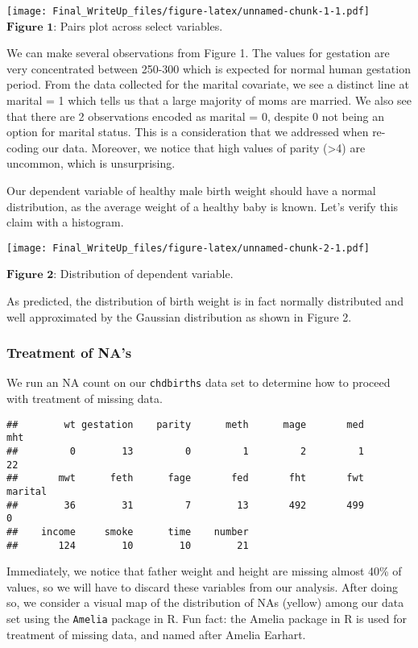 \documentclass[]{article}
\begin{document}
\texttt{[image: Final\_WriteUp\_files/figure-latex/unnamed-chunk-1-1.pdf]}
\(\textbf{Figure 1}\): Pairs plot across select variables.

We can make several observations from Figure 1. The values for gestation
are very concentrated between 250-300 which is expected for normal human
gestation period. From the data collected for the marital covariate, we
see a distinct line at marital = 1 which tells us that a large majority
of moms are married. We also see that there are 2 observations encoded
as marital = 0, despite 0 not being an option for marital status. This
is a consideration that we addressed when re-coding our data. Moreover,
we notice that high values of parity (\textgreater{}4) are uncommon,
which is unsurprising.

Our dependent variable of healthy male birth weight should have a normal
distribution, as the average weight of a healthy baby is known. Let's
verify this claim with a histogram.

\texttt{[image: Final\_WriteUp\_files/figure-latex/unnamed-chunk-2-1.pdf]}

\(\textbf{Figure 2}\): Distribution of dependent variable.

As predicted, the distribution of birth weight is in fact normally
distributed and well approximated by the Gaussian distribution as shown
in Figure 2.

\subsubsection{Treatment of NA's}\label{treatment-of-nas}

We run an NA count on our \texttt{chdbirths} data set to determine how
to proceed with treatment of missing data.

\begin{verbatim}
##        wt gestation    parity      meth      mage       med       mht 
##         0        13         0         1         2         1        22 
##       mwt      feth      fage       fed       fht       fwt   marital 
##        36        31         7        13       492       499         0 
##    income     smoke      time    number 
##       124        10        10        21
\end{verbatim}

\(\;\)\\
Immediately, we notice that father weight and height are missing almost
40\% of values, so we will have to discard these variables from our
analysis. After doing so, we consider a visual map of the distribution
of NAs (yellow) among our data set using the \texttt{Amelia} package in
R. Fun fact: the Amelia package in R is used for treatment of missing
data, and named after Amelia Earhart.
\end{document}
